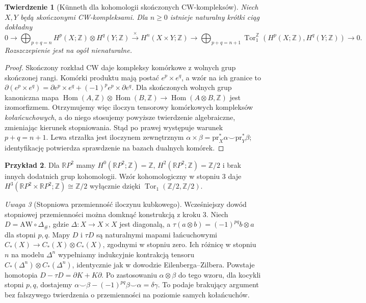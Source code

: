 \documentclass[11pt,a4paper,oneside]{report}
\newcommand{\R}{\mathbb{R}}
\newcommand{\Z}{\mathbb{Z}}
\theoremstyle{plain}
\newtheorem{twierdzenie}{Twierdzenie}[section]
\theoremstyle{definition}
\newtheorem{przyklad}[twierdzenie]{Przykład}
\theoremstyle{remark}
\newtheorem{uwaga}[twierdzenie]{Uwaga}
\begin{document}
\begin{twierdzenie}[Künneth dla kohomologii skończonych CW-kompleksów]
Niech $X,Y$ będą skończonymi CW-kompleksami. Dla $n\ge0$
istnieje naturalny krótki ciąg dokładny
\[
0\to\bigoplus_{p+q=n}H^p(X;\Z)\otimes H^q(Y;\Z)
\xrightarrow{\times}H^n(X\times Y;\Z)
\to\bigoplus_{p+q=n+1}\operatorname{Tor}^{\Z}_1
(H^p(X;\Z),H^q(Y;\Z))\to0.
\]
Rozszczepienie jest na ogół nienaturalne.
\end{twierdzenie}
\begin{proof}
Skończony rozkład CW daje kompleksy komórkowe z wolnych
grup skończonej rangi. Komórki produktu mają postać
$e^p\times e^q$, a wzór na ich granice to
$\partial(e^p\times e^q)=\partial e^p\times e^q
+(-1)^p e^p\times\partial e^q$.
Dla skończonych wolnych grup kanoniczna mapa
$\operatorname{Hom}(A,\Z)\otimes\operatorname{Hom}(B,\Z)
\to\operatorname{Hom}(A\otimes B,\Z)$ jest izomorfizmem.
Otrzymujemy więc iloczyn tensorowy komórkowych kompleksów
\emph{kołańcuchowych}, a do niego stosujemy powyższe
twierdzenie algebraiczne, zmieniając kierunek stopniowania.
Stąd po prawej występuje warunek $p+q=n+1$.
Lewa strzałka jest iloczynem zewnętrznym
$\alpha\times\beta=\mathrm{pr}_X^*\alpha\smile\mathrm{pr}_Y^*\beta$;
identyfikację potwierdza sprawdzenie na bazach dualnych komórek.
\end{proof}

\begin{przyklad}
Dla $\R P^2$ mamy $H^0(\R P^2;\Z)=\Z$,
$H^2(\R P^2;\Z)=\Z/2$ i brak innych dodatnich grup
kohomologii. Wzór kohomologiczny w stopniu $3$ daje
$H^3(\R P^2\times\R P^2;\Z)\cong\Z/2$ wyłącznie dzięki
$\operatorname{Tor}_1(\Z/2,\Z/2)$.
\end{przyklad}

\begin{uwaga}[Stopniowa przemienność iloczynu kubkowego]
Wcześniejszy dowód stopniowej przemienności można domknąć
konstrukcją z kroku 3. Niech $D=\mathrm{AW}\circ\Delta_\#$,
gdzie $\Delta:X\to X\times X$ jest diagonalą, a
$\tau(a\otimes b)=(-1)^{pq}b\otimes a$ dla stopni $p,q$.
Mapy $D$ i $\tau D$ są naturalnymi mapami łańcuchowymi
$C_*(X)\to C_*(X)\otimes C_*(X)$, zgodnymi w stopniu zero.
Ich różnicę w stopniu $n$ na modelu $\Delta^n$ wypełniamy
indukcyjnie kontrakcją tensoru
$C_*(\Delta^n)\otimes C_*(\Delta^n)$, identycznie jak w
dowodzie Eilenberga--Zilbera. Powstaje homotopia
$D-\tau D=\partial K+K\partial$. Po zastosowaniu
$\alpha\otimes\beta$ do tego wzoru, dla kocykli stopni
$p,q$, dostajemy
$\alpha\smile\beta-(-1)^{pq}\beta\smile\alpha=\delta\gamma$.
To podaje brakujący argument bez fałszywego twierdzenia o
przemienności na poziomie samych kołańcuchów.
\end{uwaga}
\end{document}
